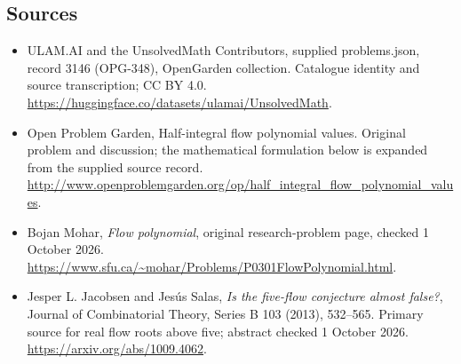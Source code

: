 \documentclass[11pt,a4paper]{article}
\begin{document}
\subsection{Sources}
\begin{itemize}
\item[S1] ULAM.AI and the UnsolvedMath Contributors, supplied problems.json, record 3146 (OPG-348), OpenGarden collection. Catalogue identity and source transcription; CC BY 4.0.
\url{https://huggingface.co/datasets/ulamai/UnsolvedMath}.
\item[S2] Open Problem Garden, Half-integral flow polynomial values. Original problem and discussion; the mathematical formulation below is expanded from the supplied source record.
\url{http://www.openproblemgarden.org/op/half_integral_flow_polynomial_values}.

\item[R1] Bojan Mohar, \emph{Flow polynomial}, original research-problem
page, checked 1 October 2026.
\url{https://www.sfu.ca/~mohar/Problems/P0301FlowPolynomial.html}.
\item[R2] Jesper L. Jacobsen and Jes\'us Salas,
\emph{Is the five-flow conjecture almost false?}, Journal of
Combinatorial Theory, Series B 103 (2013), 532--565. Primary source
for real flow roots above five; abstract checked 1 October 2026.
\url{https://arxiv.org/abs/1009.4062}.

\end{itemize}
\end{document}
